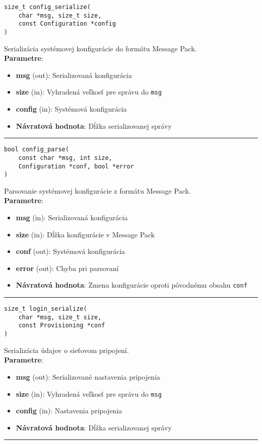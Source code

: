 \begin{lstlisting}[style=docs]
size_t config_serialize(
	char *msg, size_t size, 
	const Configuration *config
)
\end{lstlisting}
Serializácia systémovej konfigurácie do formátu Message Pack. \\ 
\textbf{Parametre}:
\begin{itemize}[noitemsep, topsep=0pt]
	\item \textbf{msg} (out): Serializovaná konfigurácia
 	\item \textbf{size} (in): Vyhradená veľkosť pre správu do \verb|msg|
	\item \textbf{config} (in): Systémová konfigurácia
	\item \textbf{Návratová hodnota}: Dĺžka serializovanej správy
\end{itemize}
\bigbreak
\hrule

\begin{lstlisting}[style=docs]
bool config_parse(
	const char *msg, int size, 
	Configuration *conf, bool *error
)
\end{lstlisting}
Parsovanie systémovej konfigurácie z formátu Message Pack. \\ 
\textbf{Parametre}:
\begin{itemize}[noitemsep, topsep=0pt]
	\item \textbf{msg} (in): Serializovaná konfigurácia
	\item \textbf{size} (in): Dĺžka konfigurácie v Message Pack
 	\item \textbf{conf} (out): Systémová konfigurácia
	\item \textbf{error} (out): Chyba pri parsovaní
	\item \textbf{Návratová hodnota}: Zmena konfigurácie oproti pôvodnému obsahu \verb|conf|
\end{itemize}
\bigbreak
\hrule

\begin{lstlisting}[style=docs]
size_t login_serialize(
	char *msg, size_t size,
	const Provisioning *conf
)
\end{lstlisting}
Serializácia údajov o sieťovom pripojení. \\ 
\textbf{Parametre}:
\begin{itemize}[noitemsep, topsep=0pt]
	\item \textbf{msg} (out): Serializované nastavenia pripojenia
	\item \textbf{size} (in): Vyhradená veľkosť pre správu do \verb|msg|
	\item \textbf{config} (in): Nastavenia pripojenia
	\item \textbf{Návratová hodnota}: Dĺžka serializovanej správy
\end{itemize}
\bigbreak
\hrule

